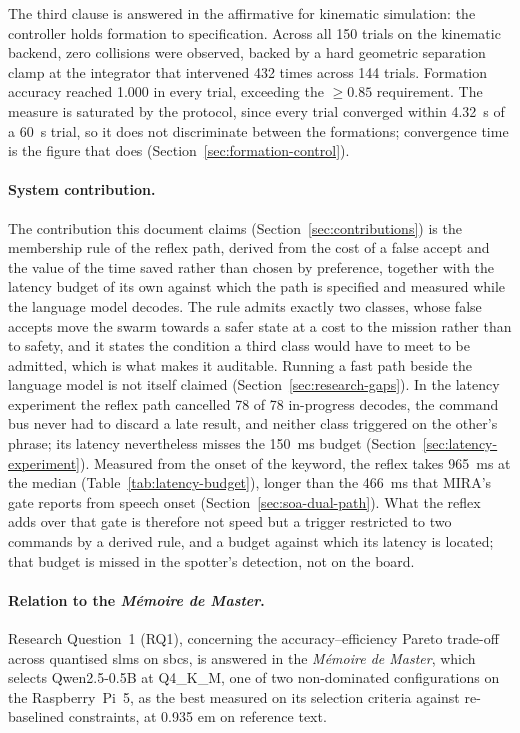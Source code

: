 The third clause is answered in the affirmative for kinematic simulation: the controller holds formation
to specification. Across all 150 trials on the kinematic backend, zero collisions were observed, backed
by a hard geometric separation clamp at the integrator that intervened 432 times across 144 trials.
Formation accuracy reached 1.000 in every trial, exceeding the $\geq 0.85$ requirement. The measure is
saturated by the protocol, since every trial converged within 4.32~s of a 60~s trial, so it does not
discriminate between the formations; convergence time is the figure that does
(Section~\ref{sec:formation-control}).

\paragraph{System contribution.} The contribution this document claims
(Section~\ref{sec:contributions}) is the membership rule of the reflex path, derived from the cost of a
false accept and the value of the time saved rather than chosen by preference, together with the latency
budget of its own against which the path is specified and measured while the language model decodes. The rule admits exactly two
classes, whose false accepts move the swarm towards a safer state at a cost to the mission rather than to
safety, and it states the condition a third class would have to meet to be admitted, which is what makes
it auditable. Running a fast path beside the language model is not itself claimed
(Section~\ref{sec:research-gaps}). In the latency experiment the reflex path cancelled 78 of 78 in-progress
decodes, the command bus never had to discard a late result, and neither class triggered on the other's
phrase; its latency nevertheless misses the 150~ms budget (Section~\ref{sec:latency-experiment}).
Measured from the onset of the keyword, the reflex takes 965~ms at the median (Table~\ref{tab:latency-budget}),
longer than the 466~ms that MIRA's gate reports from speech onset (Section~\ref{sec:soa-dual-path}).
What the reflex adds over that gate is therefore not speed but a trigger restricted to two commands by a derived rule,
and a budget against which its latency is located; that budget is missed in the spotter's detection, not on the board.

\paragraph{Relation to the \emph{M\'emoire de Master}.} Research Question~1 (RQ1), concerning the accuracy--efficiency
Pareto trade-off across quantised \glspl{slm} on \glspl{sbc}, is answered in the
\emph{M\'emoire de Master}, which selects Qwen2.5-0.5B at Q4\_K\_M, one of two non-dominated configurations on the
Raspberry~Pi~5, as the best measured on its selection criteria against re-baselined constraints, at
0.935 \gls{em} on reference text.

